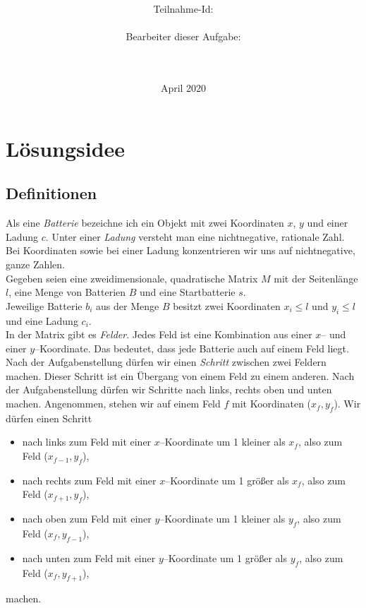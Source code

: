 \documentclass[a4paper,10pt,ngerman]{scrartcl}
\title{\textbf{\Huge\Aufgabe}}
\author{\LARGE Teilnahme-Id: \LARGE \TeilnahmeId \\\\
	    \LARGE Bearbeiter dieser Aufgabe: \\ 
	    \LARGE \Namen\\\\}
\date{\LARGE April 2020}
\begin{document}
\maketitle
\tableofcontents

\vspace{0.5cm}

\newpage
\section{Lösungsidee}
\subsection{Definitionen}\label{sec:definitions}

Als eine \textit{Batterie} bezeichne ich ein Objekt mit zwei Koordinaten $x$, $y$ und einer Ladung $c$.
Unter einer \textit{Ladung} versteht man eine nichtnegative, rationale Zahl.
Bei Koordinaten sowie bei einer Ladung konzentrieren wir uns auf nichtnegative, ganze Zahlen.\\

Gegeben seien eine zweidimensionale, quadratische Matrix $M$ mit der Seitenlänge $l$, eine Menge von Batterien $B$
und eine Startbatterie $s$.\\
Jeweilige Batterie $b_i$ aus der Menge $B$ besitzt zwei Koordinaten $x_i \leqslant l$ und $y_i \leqslant l$ und eine Ladung $c_i$.\\
In der Matrix gibt es \textit{Felder}. Jedes Feld ist eine Kombination aus einer $x$-- und einer $y$--Koordinate.
Das bedeutet, dass jede Batterie auch auf einem Feld liegt.\\

Nach der Aufgabenstellung dürfen wir einen \textit{Schritt} zwischen zwei Feldern machen. Dieser Schritt ist 
ein Übergang von einem Feld zu einem anderen. Nach der Aufgabenstellung dürfen wir Schritte nach links, rechts oben und unten machen.
Angenommen, stehen wir auf einem Feld $f$ mit Koordinaten ($x_f,y_f$). Wir dürfen einen Schritt
\begin{itemize}
\item nach links zum Feld mit einer $x$--Koordinate um 1 kleiner als $x_f$, also zum Feld ($x_{f-1},y_f$),
\item nach rechts zum Feld mit einer $x$--Koordinate um 1 größer als $x_f$, also zum Feld ($x_{f+1},y_f$),
\item nach oben zum Feld mit einer $y$--Koordinate um 1 kleiner als $y_f$, also zum Feld ($x_f,y_{f-1}$),
\item nach unten zum Feld mit einer $y$--Koordinate um 1 größer als $y_f$, also zum Feld ($x_f,y_{f+1}$),
\end{itemize}
machen.
\end{document}
